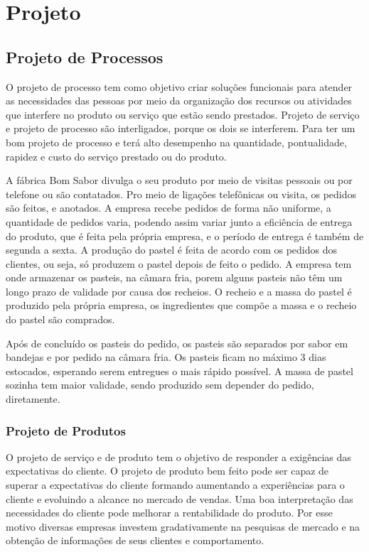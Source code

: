 \section{Projeto}

\subsection{Projeto de Processos}

O projeto de processo tem como objetivo criar soluções funcionais para atender as necessidades das pessoas por meio da organização dos recursos ou atividades que interfere no produto ou serviço que estão sendo prestados. Projeto de serviço e projeto de processo são interligados, porque os dois se interferem. Para ter um bom projeto de processo e terá alto desempenho na quantidade, pontualidade, rapidez e custo do serviço prestado ou do produto.

A fábrica Bom Sabor divulga o seu produto por meio de visitas pessoais ou por telefone ou são contatados.
Pro meio de ligações telefônicas ou visita, os pedidos são feitos, e anotados. A empresa recebe pedidos de forma não uniforme, a quantidade de pedidos varia, podendo assim variar junto a eficiência de entrega do produto, que é feita pela própria empresa, e o período de entrega é também de segunda a sexta. A produção do pastel é feita de acordo com os pedidos dos clientes, ou seja, só produzem o pastel depois de feito o pedido. A empresa tem onde armazenar os pasteis, na câmara fria, porem alguns pasteis não têm um longo prazo de validade por causa dos recheios. O recheio e a massa do pastel é produzido pela própria empresa, os ingredientes que compõe a massa e o recheio do pastel são comprados.

Após de concluído os pasteis do pedido, os pasteis são separados por sabor em bandejas e por pedido na câmara fria. Os pasteis ficam no máximo 3 dias estocados, esperando serem entregues o mais rápido possível. A massa de pastel sozinha tem maior validade, sendo produzido sem depender do pedido, diretamente. 

\subsubsection{Projeto de Produtos}

O projeto de serviço e de produto tem o objetivo de responder a exigências das expectativas do cliente. O projeto de produto bem feito pode ser capaz de superar a expectativas do cliente formando aumentando a experiências para o cliente e evoluindo a alcance no mercado de vendas. Uma boa interpretação das necessidades do cliente pode melhorar a rentabilidade do produto. Por esse motivo diversas empresas investem gradativamente na pesquisas de mercado e na obtenção de informações de seus clientes e comportamento.

